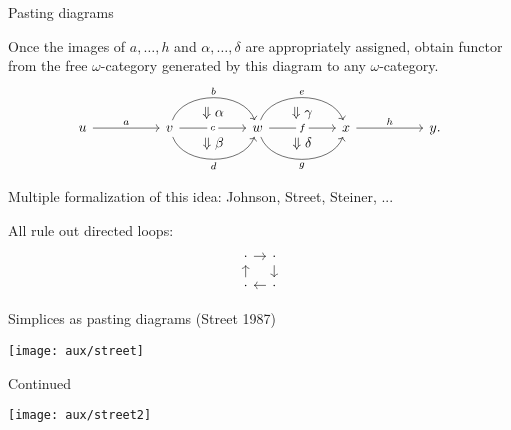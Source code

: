 \begin{frame}[fragile]{Pasting diagrams}
	\pause
	
	Once the images of $a,\dots,h$ and $\alpha,\dots,\delta$ are appropriately assigned, obtain functor from the free $\omega$-category generated by this diagram to any $\omega$-category.
	\[
	\begin{tikzcd}[ampersand replacement = \&]
		u \arrow[rr,"a"] \& \& v \arrow[rr,"c"{description},""{auto = false,name = c}]
		\arrow[rr,out = 70,in = 110,"b",""{auto = false,name = b}]
		\arrow[rr,out = -70,in = -110,"d"',""{auto = false,name = p}]
		\arrow[phantom,"\Downarrow \alpha",from = b,to = c]
		\arrow[phantom,"\Downarrow \beta",from = c,to = p]
		\& \& w \arrow[rr,"f"{description},""{auto = false,name = f}] \arrow[rr,out = 70,in = 110,"e",""{auto = false,name = e}]
		\arrow[rr,out = -70,in = -110,"g"',""{auto = false,name = g}] \& \& x \arrow[rr,"h",""{auto = false,name = h}] \& \& y.
		\arrow[phantom,"\Downarrow \gamma",from = e,to = f]
		\arrow[phantom,"\Downarrow \delta",from = f,to = g]
	\end{tikzcd}
	\]
	
	\pause\medskip Multiple formalization of this idea: Johnson, Street, Steiner, ...
	
	\pause\medskip All rule out directed loops:
	\[
	\begin{tikzcd}[column sep=9pt,row sep=9pt]
		\arrow[d,<-] \arrow[r] \cdot & \arrow[d] \cdot \\
		\arrow[r,,<-] \cdot & \cdot
	\end{tikzcd}
	\]
\end{frame}

\begin{frame}{Simplices as pasting diagrams (Street 1987)}
	\pause
	\begin{center}
		\texttt{[image: aux/street]}
	\end{center}
\end{frame}

\begin{frame}{Continued}
	\vspace*{-10pt}
	\begin{center}
		\texttt{[image: aux/street2]}
	\end{center}
\end{frame}

